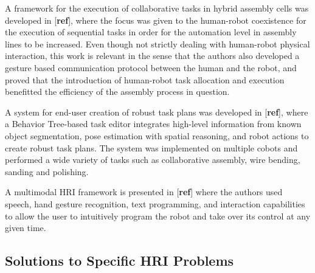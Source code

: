 \par A framework for the execution of collaborative tasks in hybrid assembly cells was developed in [\textbf{ref}], where the focus was given to the human-robot coexistence for the execution of sequential tasks in order for the automation level in assembly lines to be increased. Even though not strictly dealing with human-robot physical interaction, this work is relevant in the sense that the authors also developed a gesture based communication protocol between the human and the robot, and proved that the introduction of human-robot task allocation and execution benefitted the efficiency of the assembly process in question.
\par A system for end-user creation of robust task plans was developed in [\textbf{ref}], where a Behavior Tree-based task editor integrates high-level information from known object segmentation, pose estimation with spatial reasoning, and robot actions to create robust task plans. The system was implemented on multiple cobots and performed a wide variety of tasks such as collaborative assembly, wire bending, sanding and polishing.
\par A multimodal HRI framework is presented in [\textbf{ref}] where the authors used speech, hand gesture recognition, text programming, and interaction capabilities to allow the user to intuitively program the robot and take over its control at any given time. 

\subsection{Solutions to Specific HRI Problems}

